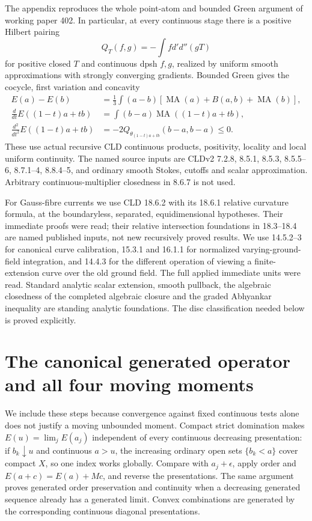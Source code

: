 \documentclass[11pt]{article}
\newcommand{\DD}{d'd''}
\newcommand{\MA}{\operatorname{MA}}
\theoremstyle{remark}\newtheorem{remark}[theorem]{Remark}
\begin{document}
The appendix reproduces the whole point-atom and bounded Green
argument of working paper 402. In particular, at every continuous
stage there is a positive Hilbert pairing
\[
Q_T(f,g)=-\int f\DD(gT)
\]
for positive closed $T$ and continuous dpsh $f,g$, realized by
uniform smooth approximations with strongly converging gradients.
Bounded Green gives the cocycle, first variation and concavity
\begin{align}
E(a)-E(b)&=\frac13\int(a-b)[\MA(a)+B(a,b)+\MA(b)],\label{403cocycle}\\
\frac d{dt}E((1-t)a+tb)&=\int(b-a)\MA((1-t)a+tb),\label{403var}\\
\frac{d^2}{dt^2}E((1-t)a+tb)&=-2Q_{\theta_{(1-t)a+tb}}(b-a,b-a)\le0.
\end{align}
These use actual recursive CLD continuous products, positivity,
locality and local uniform continuity. The named source inputs are
CLDv2 7.2.8, 8.5.1, 8.5.3, 8.5.5--6, 8.7.1--4, 8.8.4--5,
and ordinary smooth Stokes, cutoffs and scalar approximation.
Arbitrary continuous-multiplier closedness in 8.6.7 is not used.

For Gauss-fibre currents we use CLD 18.6.2 with its 18.6.1
relative curvature formula, at the boundaryless, separated,
equidimensional hypotheses. Their immediate proofs were read;
their relative intersection foundations in 18.3--18.4 are named
published inputs, not new recursively proved results. We use
14.5.2--3 for canonical curve calibration, 15.3.1 and 16.1.1 for
normalized varying-ground-field integration, and 14.4.3 for the
different operation of viewing a finite-extension curve over the
old ground field. The full applied immediate units were read.
Standard analytic scalar extension, smooth pullback, the
algebraic closedness of the completed algebraic closure and the
graded Abhyankar inequality are standing analytic foundations.
The disc classification needed below is proved explicitly.

\section{The canonical generated operator and all four moving moments}
We include these steps because convergence against fixed continuous
tests alone does not justify a moving unbounded moment.
Compact strict domination makes $E(u)=\lim_j E(a_j)$ independent of
every continuous decreasing presentation: if $b_k\downarrow u$
and continuous $a>u$, the increasing ordinary open sets $\{b_k<a\}$
cover compact $X$, so one index works globally. Compare with
$a_j+\epsilon$, apply order and $E(a+c)=E(a)+Mc$, and reverse
the presentations. The same argument proves generated order
preservation and continuity when a decreasing generated sequence
already has a generated limit. Convex combinations are generated
by the corresponding continuous diagonal presentations.
\end{document}
